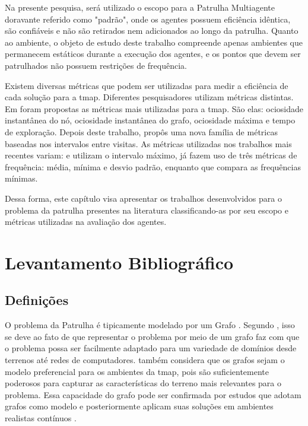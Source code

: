 Na presente pesquisa, será utilizado o escopo para a Patrulha Multiagente 
doravante referido como "padrão", onde os agentes possuem eficiência idêntica, 
são confiáveis e não são retirados nem adicionados ao longo da patrulha. Quanto 
ao ambiente, o objeto de estudo deste trabalho compreende apenas ambientes que 
permanecem estáticos durante a execução dos agentes, e os pontos que devem ser 
patrulhados não possuem restrições de frequência.

Existem diversas métricas que podem ser utilizadas para medir a eficiência de 
cada solução para a \ac{tmap}. Diferentes pesquisadores utilizam métricas 
distintas. Em \citep{Machado:2002:MPE:1765317.1765332} foram propostas as 
métricas mais utilizadas para a \ac{tmap}. São elas: ociosidade instantânea do 
nó, ociosidade instantânea do grafo, ociosidade máxima e tempo de exploração. 
Depois deste trabalho, \citep{sampaiophd} propôs uma nova família de métricas 
baseadas nos intervalos entre visitas. As métricas utilizadas nos trabalhos mais 
recentes variam: \citep{6900280} e \citep{Pippin:2013:PBT:2480362.2480378} 
utilizam o intervalo máximo, já \citep{4209122} fazem uso de três métricas de 
frequência: média, mínima e desvio padrão, enquanto que 
\citep{hernandez2013game} compara as frequências mínimas.

Dessa forma, este capítulo visa apresentar os trabalhos desenvolvidos para o 
problema da patrulha presentes na literatura classificando-as por seu escopo e 
métricas utilizadas na avaliação dos agentes.

\section{Levantamento Bibliográfico}

\subsection{Definições}
\label{definicoes_tmap}

O problema da Patrulha é tipicamente modelado por um Grafo 
\citep{Rosen:2002:DMA:579402}. Segundo \citep{Almeida:2004:AAI}, isso se deve 
ao fato de que representar o problema por meio de um grafo faz com que o 
problema possa ser facilmente adaptado para um variedade de domínios desde 
terrenos até redes de computadores. \citep{sampaiophd} também considera que os 
grafos sejam o modelo preferencial para os ambientes da \ac{tmap}, pois são 
suficientemente poderosos para capturar as características do terreno mais 
relevantes para o problema. Essa capacidade do grafo pode ser confirmada por 
estudos que adotam grafos como modelo e posteriormente aplicam suas soluções em 
ambientes realistas contínuos \citep{Pippin:2013:PBT:2480362.2480378}.

